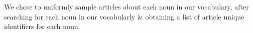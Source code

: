 We chose to uniformly sample articles about each noun in our vocabulary,
after searching for each noun in our vocabularly \& obtaining a list of
article unique identifiers for each noun.
